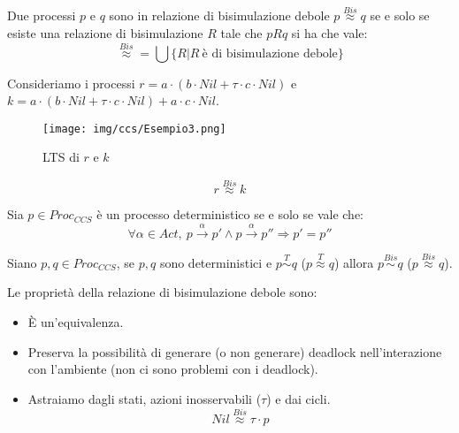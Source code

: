 Due processi $p$ e $q$ sono in relazione di bisimulazione debole $p
    \stackrel{Bis}{\approx} q$
se e solo se esiste una relazione di bisimulazione $R$ tale che $p R q$ si ha che vale:
\begin{equation}
    \stackrel{Bis}{\approx} = \bigcup \{R | R \ \text{è di bisimulazione debole}\}
\end{equation}
\begin{esempio}
    Consideriamo i processi $r = a \cdot (b \cdot Nil + \tau \cdot c \cdot Nil)$
    e $k = a \cdot (b \cdot Nil + \tau \cdot c \cdot Nil) + a \cdot c \cdot Nil$.
    \begin{figure}[!ht]
        \centering
        \texttt{[image: img/ccs/Esempio3.png]}
        \caption{LTS di $r$ e $k$}
    \end{figure}
    $$r \stackrel{Bis}{\approx} k$$
\end{esempio}
\begin{definizione}
    Sia $p \in Proc_{CCS}$ è un processo deterministico se e solo se vale che:
    \begin{equation}
        \forall \alpha \in Act, \ p \xrightarrow{\alpha} p' \land p
        \xrightarrow{\alpha} p'' \Rightarrow p' = p''
    \end{equation}
\end{definizione}
\begin{osservazione}
    Siano $p, q \in Proc_{CCS}$, se $p, q$ sono deterministici e $p \stackrel{T}{\sim}
        q$ ($p \stackrel{T}{\approx} q$) allora $p \stackrel{Bis}{\sim}
        q$ ($p \stackrel{Bis}{\approx} q$).
\end{osservazione}
\begin{osservazione}
    Le proprietà della relazione di bisimulazione debole sono:
    \begin{itemize}
        \item È un'equivalenza.
        \item Preserva la possibilità di generare (o non generare) deadlock
              nell'interazione con l'ambiente (non ci sono problemi con i deadlock).
        \item Astraiamo dagli stati, azioni inosservabili ($\tau$) e dai cicli.
              \begin{equation}
                  Nil \stackrel{Bis}{\approx} \tau \cdot p
              \end{equation}
    \end{itemize}
\end{osservazione}
